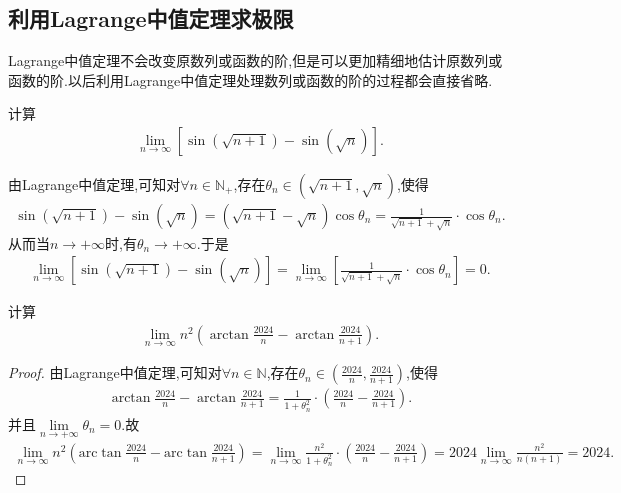 \documentclass[lang=cn,newtx,10pt,scheme=chinese]{elegantbook}
\begin{document}
\subsection{利用Lagrange中值定理求极限}
Lagrange中值定理不会改变原数列或函数的阶,但是可以更加精细地估计原数列或函数的阶.以后利用Lagrange中值定理处理数列或函数的阶的过程都会直接省略.

\begin{example}
计算
\begin{align*}
   \lim_{n \to \infty} [\sin(\sqrt{n + 1}) - \sin(\sqrt{n})].
\end{align*}
\end{example}
\begin{solution}
   由Lagrange中值定理,可知对$\forall n\in\mathbb{N}_+$,存在$\theta_n \in(\sqrt{n+1},\sqrt{n})$,使得
   \begin{align*}
      \sin(\sqrt{n+1})-\sin(\sqrt{n})=(\sqrt{n+1}-\sqrt{n})\cos\theta_n=\frac{1}{\sqrt{n+1}+\sqrt{n}}\cdot \cos\theta_n.
   \end{align*}
从而当$n\to +\infty$时,有$\theta_n \to +\infty$.于是
\begin{align*}
   \lim_{n \to \infty} [\sin(\sqrt{n + 1}) - \sin(\sqrt{n})]=\lim_{n \to \infty} [\frac{1}{\sqrt{n+1}+\sqrt{n}}\cdot \cos\theta_n]=0.
\end{align*}
\end{solution}

\begin{example}
   计算
\begin{align*}
   \lim_{n \to \infty} n^2 \left(\arctan\frac{2024}{n} - \arctan\frac{2024}{n + 1}\right).
\end{align*}
\end{example}
\begin{proof}
   由Lagrange中值定理,可知对$\forall n\in\mathbb{N}$,存在$\theta_n\in(\frac{2024}{n},\frac{2024}{n + 1})$,使得
   \begin{align*}
      \arctan\frac{2024}{n} - \arctan\frac{2024}{n + 1} = \frac{1}{1+\theta _{n}^{2}}\cdot \left( \frac{2024}{n}-\frac{2024}{n+1} \right).
   \end{align*}
并且$\underset{n\rightarrow +\infty}{\lim}\theta _n=0$.故
\begin{align*}
   \lim_{n\rightarrow \infty} n^2\left( \mathrm{arc}\tan \frac{2024}{n}-\mathrm{arc}\tan \frac{2024}{n+1} \right) =\lim_{n\rightarrow \infty} \frac{n^2}{1+\theta _{n}^{2}}\cdot \left( \frac{2024}{n}-\frac{2024}{n+1} \right) =2024\lim_{n\rightarrow \infty} \frac{n^2}{n\left( n+1 \right)}=2024.
\end{align*}
\end{proof}
\end{document}
